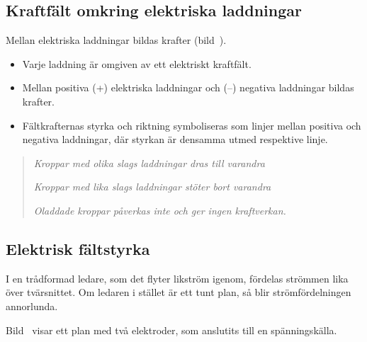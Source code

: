 \newpage
{}


\subsection{Kraftfält omkring elektriska laddningar}


\noindent
Mellan elektriska laddningar bildas krafter (bild~).

\begin{itemize}
  \item Varje laddning är omgiven av ett elektriskt kraftfält.
  \item Mellan positiva (+) elektriska laddningar och (--) negativa laddningar
  bildas krafter.
  \item Fältkrafternas styrka och riktning symboliseras som linjer mellan
  positiva och negativa laddningar, där styrkan är densamma utmed respektive
  linje.
\end{itemize}


\begin{quote}
\emph{Kroppar med olika slags laddningar dras till varandra}

\emph{Kroppar med lika slags laddningar stöter bort varandra}

\emph{Oladdade kroppar påverkas inte och ger ingen kraftverkan.}
\end{quote}

\subsection{Elektrisk fältstyrka}
\label{elektrisk_fälststyrka}


I en trådformad ledare, som det flyter likström igenom, fördelas strömmen lika
över tvärsnittet.
Om ledaren i stället är ett tunt plan, så blir strömfördelningen annorlunda.

Bild~ visar ett plan med två elektroder, som anslutits
till en spänningskälla.


